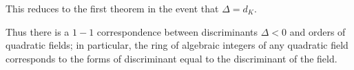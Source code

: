 \documentclass[12pt]{article}
\theoremstyle{definition}
\begin{document}
This reduces to the first theorem in the event that $\Delta=d_K$.

Thus there is a $1-1$ correspondence between discriminants $\Delta<0$ and orders of quadratic fields; in particular, the ring of algebraic integers of any quadratic field corresponds to the forms of discriminant equal to the discriminant of the field.
\end{document}
